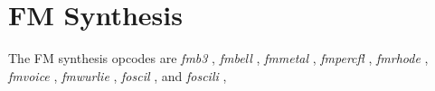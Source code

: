 \begin{comment}
\documentclass[10pt]{article}
\usepackage{fullpage, graphicx, url}
\setlength{\parskip}{1ex}
\setlength{\parindent}{0ex}
\title{FM Synthesis}



\begin{tabular}{ccc}
The Alternative Csound Reference Manual & & \\
Previous &Signal Generators &Next

\end{tabular}

\end{comment}
\section{FM Synthesis}


  The FM synthesis opcodes are \emph{fmb3}
, \emph{fmbell}
, \emph{fmmetal}
, \emph{fmpercfl}
, \emph{fmrhode}
, \emph{fmvoice}
, \emph{fmwurlie}
, \emph{foscil}
, and \emph{foscili}
, 


\begin{comment}
\begin{tabular}{lcr}
Previous &Home &Next \\
Dynamic Spectrum Oscillators &Up &Granular Synthesis

\end{tabular}



\end{comment}
